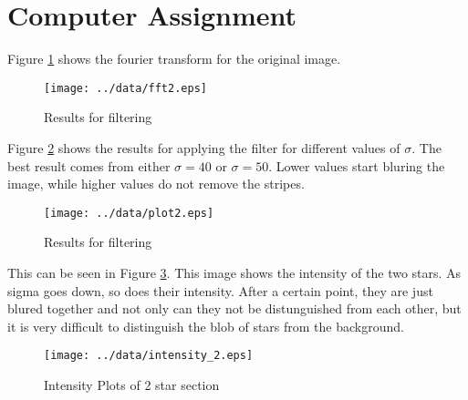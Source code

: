 \documentclass[10pt, a4paper]{article}
\begin{document}

\section{Computer Assignment}
Figure \ref{fig:fft} shows the fourier transform for the original image.
\linebreak
\begin{figure}[h!]
  \centering
  \texttt{[image: ../data/fft2.eps]}
  \caption{Results for filtering}
  \label{fig:fft}
\end{figure}

Figure \ref{fig:filter} shows the results for applying the filter for different values of $\sigma$. The best result 
comes from either $\sigma = 40$ or $\sigma = 50$. Lower values start bluring the image, while higher values do not
remove the stripes.
\begin{figure}[h!]
  \centering
  \texttt{[image: ../data/plot2.eps]}
  \caption{Results for filtering}
  \label{fig:filter}
\end{figure}
This can be seen in Figure \ref{fig:intensity}. This image shows the intensity of the two stars. As sigma goes down, so does
their intensity. After a certain point, they are just blured together and not only can they not be distunguished from each other,
but it is very difficult to distinguish the blob of stars from the background.

\begin{figure}[h!]
  \centering
  \texttt{[image: ../data/intensity\_2.eps]}
  \caption{Intensity Plots of 2 star section}
  \label{fig:intensity}
\end{figure}
\end{document}
